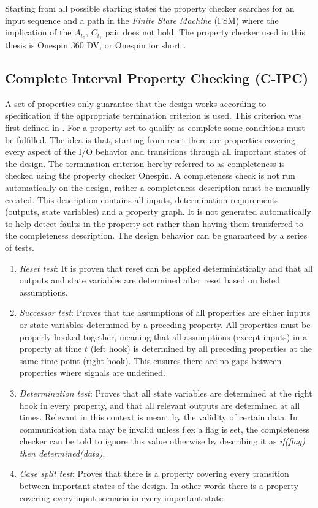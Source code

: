 Starting from all possible starting states the property checker searches for an input sequence and a path in the \textit{Finite State Machine} (FSM) where the implication of the $A_{t_0}$, $C_{t_1}$ pair does not hold. The property checker used in this thesis is Onespin 360 DV, or Onespin for short \cite{onespin}. 

\subsection{Complete Interval Property Checking (C-IPC)}
\label{sub:cipc}
A set of properties only guarantee that the design works according to specification if the appropriate termination criterion is used. This criterion was first defined in \cite{bormannbusch}. For a property set to qualify as complete some conditions must be fulfilled. The idea is that, starting from reset there are properties covering every aspect of the I/O behavior and transitions through all important states of the design. The termination criterion hereby referred to as completeness is checked using the property checker Onespin.   A completeness check is not run automatically on the design, rather a completeness description must be manually created. This description contains all inputs, determination requirements (outputs, state variables) and a property graph. It is not generated automatically to help detect faults in the property set rather than having them transferred to the completeness description. The design behavior can be guaranteed by a series of tests.
\begin{enumerate}
 \item \textit{Reset test}: It is proven that reset can be applied deterministically and that all outputs and state variables are determined after reset based on listed assumptions.
 \item \textit{Successor test}: Proves that the assumptions of all properties are either inputs or state variables determined by a preceding property. All properties must be properly hooked together, meaning that all assumptions (except inputs) in a property at time $t$ (left hook) is determined by all preceding properties at the same time point (right hook). This ensures there are no gaps between properties where signals are undefined. 
 \item \textit{Determination test}: Proves that all state variables are determined at the right hook in every property, and that all relevant outputs are determined at all times. Relevant in this context is meant by the validity of certain data. In communication data may be invalid unless f.ex a flag is set, the completeness checker can be told to ignore this value otherwise by describing it as \textit{if(flag) then determined(data)}.
 \item \textit{Case split test}: Proves that there is a property covering every transition between important states of the design. In other words there is a property covering every input scenario in every important state. 
\end{enumerate}

